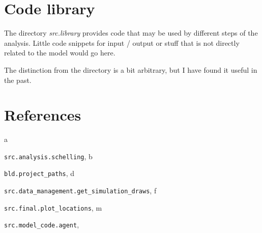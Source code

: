 \documentclass[a4paper,11pt,english]{sphinxmanual}
\begin{document}
\chapter{Code library}
\label{library:code-library}\label{library::doc}\label{library:library}
The directory \emph{src.library} provides code that may be used by different steps of the analysis. Little code snippets for input / output or stuff that is not directly related to the model would go here.

The distinction from the {\hyperref[model_code:model\string-code]{}} directory is a bit arbitrary, but I have found it useful in the past.


\chapter{References}
\label{references:references}\label{references::doc}\label{references:id1}


\begin{thebibliography}{1}
\end{thebibliography}


\renewcommand{\indexname}{Python Module Index}
\begin{theindex}
\def\bigletter#1{{\Large\sffamily#1}\nopagebreak\vspace{1mm}}
\bigletter{a}
\item {\texttt{src.analysis.schelling}}, \pageref{analysis:module-src.analysis.schelling}
\indexspace
\bigletter{b}
\item {\texttt{bld.project\_paths}}, \pageref{introduction:module-bld.project_paths}
\indexspace
\bigletter{d}
\item {\texttt{src.data\_management.get\_simulation\_draws}}, \pageref{data_management:module-src.data_management.get_simulation_draws}
\indexspace
\bigletter{f}
\item {\texttt{src.final.plot\_locations}}, \pageref{final:module-src.final.plot_locations}
\indexspace
\bigletter{m}
\item {\texttt{src.model\_code.agent}}, \pageref{model_code:module-src.model_code.agent}
\end{theindex}

\renewcommand{\indexname}{Index}
\printindex
\end{document}
